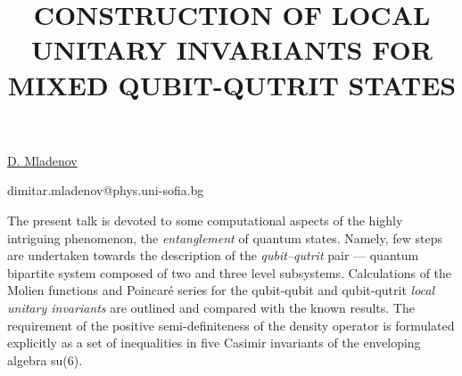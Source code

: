 \title{CONSTRUCTION OF LOCAL UNITARY INVARIANTS FOR MIXED QUBIT-QUTRIT STATES}

\underline{D. Mladenov} 

{\normalsize{

\vspace{-4mm} \unisofia

\email dimitar.mladenov@phys.uni-sofia.bg}}

The present talk is devoted to some computational aspects of the highly intriguing phenomenon, the \textit{entanglement} of quantum states.
Namely, few steps are undertaken towards the description of the \textit{qubit--qutrit} pair ---
quantum bipartite system composed of two and three level subsystems.
Calculations of the Molien functions and Poincar\'{e} series for the qubit-qubit and qubit-qutrit \textit{local unitary invariants}
are outlined and compared with the known results.
The requirement of the positive semi-definiteness of the density operator is formulated explicitly as a set of inequalities in
five Casimir invariants of the enveloping algebra su(6).

\vspace{\baselineskip}
